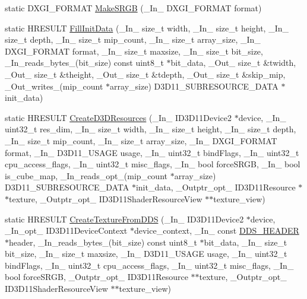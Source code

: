 \begin{DoxyCompactItemize}
\item 
static D\+X\+G\+I\+\_\+\+F\+O\+R\+M\+AT \hyperlink{namespacemage_a35ccdb42bbc027d3678b849fb962f3d3}{Make\+S\+R\+GB} (\+\_\+\+In\+\_\+ D\+X\+G\+I\+\_\+\+F\+O\+R\+M\+AT format)
\item 
static H\+R\+E\+S\+U\+LT \hyperlink{namespacemage_ac20162a68be6828c38072a3afb0711c1}{Fill\+Init\+Data} (\+\_\+\+In\+\_\+ size\+\_\+t width, \+\_\+\+In\+\_\+ size\+\_\+t height, \+\_\+\+In\+\_\+ size\+\_\+t depth, \+\_\+\+In\+\_\+ size\+\_\+t mip\+\_\+count, \+\_\+\+In\+\_\+ size\+\_\+t array\+\_\+size, \+\_\+\+In\+\_\+ D\+X\+G\+I\+\_\+\+F\+O\+R\+M\+AT format, \+\_\+\+In\+\_\+ size\+\_\+t maxsize, \+\_\+\+In\+\_\+ size\+\_\+t bit\+\_\+size, \+\_\+\+In\+\_\+reads\+\_\+bytes\+\_\+(bit\+\_\+size) const uint8\+\_\+t $\ast$bit\+\_\+data, \+\_\+\+Out\+\_\+ size\+\_\+t \&twidth, \+\_\+\+Out\+\_\+ size\+\_\+t \&theight, \+\_\+\+Out\+\_\+ size\+\_\+t \&tdepth, \+\_\+\+Out\+\_\+ size\+\_\+t \&skip\+\_\+mip, \+\_\+\+Out\+\_\+writes\+\_\+(mip\+\_\+count $\ast$array\+\_\+size) D3\+D11\+\_\+\+S\+U\+B\+R\+E\+S\+O\+U\+R\+C\+E\+\_\+\+D\+A\+TA $\ast$init\+\_\+data)
\item 
static H\+R\+E\+S\+U\+LT \hyperlink{namespacemage_a45746b9c8018b682c999fe1c5d4158db}{Create\+D3\+D\+Resources} (\+\_\+\+In\+\_\+ I\+D3\+D11\+Device2 $\ast$device, \+\_\+\+In\+\_\+ uint32\+\_\+t res\+\_\+dim, \+\_\+\+In\+\_\+ size\+\_\+t width, \+\_\+\+In\+\_\+ size\+\_\+t height, \+\_\+\+In\+\_\+ size\+\_\+t depth, \+\_\+\+In\+\_\+ size\+\_\+t mip\+\_\+count, \+\_\+\+In\+\_\+ size\+\_\+t array\+\_\+size, \+\_\+\+In\+\_\+ D\+X\+G\+I\+\_\+\+F\+O\+R\+M\+AT format, \+\_\+\+In\+\_\+ D3\+D11\+\_\+\+U\+S\+A\+GE usage, \+\_\+\+In\+\_\+ uint32\+\_\+t bind\+Flags, \+\_\+\+In\+\_\+ uint32\+\_\+t cpu\+\_\+access\+\_\+flags, \+\_\+\+In\+\_\+ uint32\+\_\+t misc\+\_\+flags, \+\_\+\+In\+\_\+ bool force\+S\+R\+GB, \+\_\+\+In\+\_\+ bool is\+\_\+cube\+\_\+map, \+\_\+\+In\+\_\+reads\+\_\+opt\+\_\+(mip\+\_\+count $\ast$array\+\_\+size) D3\+D11\+\_\+\+S\+U\+B\+R\+E\+S\+O\+U\+R\+C\+E\+\_\+\+D\+A\+TA $\ast$init\+\_\+data, \+\_\+\+Outptr\+\_\+opt\+\_\+ I\+D3\+D11\+Resource $\ast$$\ast$texture, \+\_\+\+Outptr\+\_\+opt\+\_\+ I\+D3\+D11\+Shader\+Resource\+View $\ast$$\ast$texture\+\_\+view)
\item 
static H\+R\+E\+S\+U\+LT \hyperlink{namespacemage_a53fb464961d52002316f17c59ce58078}{Create\+Texture\+From\+D\+DS} (\+\_\+\+In\+\_\+ I\+D3\+D11\+Device2 $\ast$device, \+\_\+\+In\+\_\+opt\+\_\+ I\+D3\+D11\+Device\+Context $\ast$device\+\_\+context, \+\_\+\+In\+\_\+ const \hyperlink{structmage_1_1_d_d_s___h_e_a_d_e_r}{D\+D\+S\+\_\+\+H\+E\+A\+D\+ER} $\ast$header, \+\_\+\+In\+\_\+reads\+\_\+bytes\+\_\+(bit\+\_\+size) const uint8\+\_\+t $\ast$bit\+\_\+data, \+\_\+\+In\+\_\+ size\+\_\+t bit\+\_\+size, \+\_\+\+In\+\_\+ size\+\_\+t maxsize, \+\_\+\+In\+\_\+ D3\+D11\+\_\+\+U\+S\+A\+GE usage, \+\_\+\+In\+\_\+ uint32\+\_\+t bind\+Flags, \+\_\+\+In\+\_\+ uint32\+\_\+t cpu\+\_\+access\+\_\+flags, \+\_\+\+In\+\_\+ uint32\+\_\+t misc\+\_\+flags, \+\_\+\+In\+\_\+ bool force\+S\+R\+GB, \+\_\+\+Outptr\+\_\+opt\+\_\+ I\+D3\+D11\+Resource $\ast$$\ast$texture, \+\_\+\+Outptr\+\_\+opt\+\_\+ I\+D3\+D11\+Shader\+Resource\+View $\ast$$\ast$texture\+\_\+view)

\end{DoxyCompactItemize}
